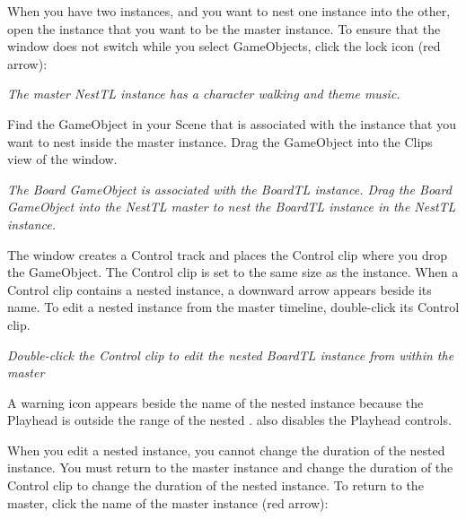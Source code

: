 When you have two  instances, and you want to nest one instance into the other, open the  instance that you want to be the master  instance. To ensure that the  window does not switch while you select Game\+Objects, click the lock icon (red arrow)\+:



{\itshape The master Nest\+TL  instance has a character walking and theme music.}

Find the Game\+Object in your Scene that is associated with the  instance that you want to nest inside the master  instance. Drag the Game\+Object into the Clips view of the  window.



{\itshape The Board Game\+Object is associated with the Board\+TL  instance. Drag the Board Game\+Object into the Nest\+TL master  to nest the Board\+TL  instance in the Nest\+TL  instance.}

The  window creates a Control track and places the Control clip where you drop the Game\+Object. The Control clip is set to the same size as the  instance. When a Control clip contains a nested  instance, a downward arrow appears beside its name. To edit a nested  instance from the master timeline, double-\/click its Control clip.



{\itshape Double-\/click the Control clip to edit the nested Board\+TL  instance from within the master}

A warning icon appears beside the name of the nested  instance because the  Playhead is outside the range of the nested .  also disables the  Playhead controls.

When you edit a nested  instance, you cannot change the duration of the nested  instance. You must return to the master  instance and change the duration of the Control clip to change the duration of the nested  instance. To return to the master, click the name of the master  instance (red arrow)\+:



